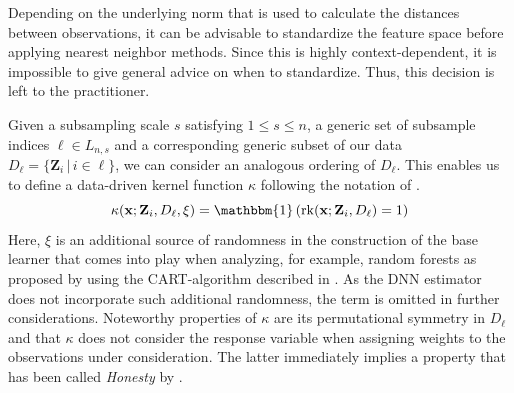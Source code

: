 \documentclass[letterpaper,10pt]{article}
\numberwithin{equation}{section}
\numberwithin{theorem}{section}
\numberwithin{remark}{section}
\numberwithin{example}{section}
\theoremstyle{definition}
\newcommand{\1}{\mathbb{1}}
\begin{document}
\vspace{0.5cm}
\begin{remark}[Standardization]
	Depending on the underlying norm that is used to calculate the distances between observations, it can be advisable to standardize the feature space before applying nearest neighbor methods.
	Since this is highly context-dependent, it is impossible to give general advice on when to standardize.
	Thus, this decision is left to the practitioner.
\end{remark}
Given a subsampling scale $s$ satisfying $1 \leq s \leq n$, a generic set of subsample indices $\ell \in L_{n,s}$ and a corresponding generic subset of our data $D_{\ell} = \{\mathbf{Z}_i \, | \, i \in \ell\}$, we can consider an analogous ordering of $D_{\ell}$.
This enables us to define a data-driven kernel function $\kappa$ following the notation of \citet{ritzwoller_uniform_2024}.
\begin{equation}
	\kappa(\mathbf{x}; \mathbf{Z}_i, D_{\ell}, \xi)
	= \mathbbm{1}\left(\operatorname{rk}(\mathbf{x}; \mathbf{Z}_i, D_{\ell}) = 1\right)
\end{equation}
Here, $\xi$ is an additional source of randomness in the construction of the base learner that comes into play when analyzing, for example, random forests as proposed by \citet{breiman_random_2001} using the CART-algorithm described in \citet{breiman_classification_2017}.
As the DNN estimator does not incorporate such additional randomness, the term is omitted in further considerations.
Noteworthy properties of $\kappa$ are its permutational symmetry in $D_{\ell}$ and that $\kappa$ does not consider the response variable when assigning weights to the observations under consideration.
The latter immediately implies a property that has been called \textit{Honesty} by \citet{wager_estimation_2018}.
\end{document}
